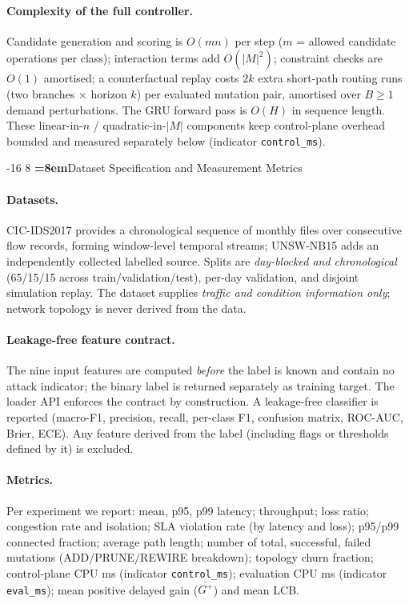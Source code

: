 \documentclass[runningheads]{llncs}
\makeatletter
\renewcommand\section{\@startsection{section}{1}{\z@}%
  {-16\p@ \@plus -4\p@ \@minus -4\p@}%
  {8\p@ \@plus 4\p@ \@minus 4\p@}%
  {\normalfont\large\bfseries\boldmath\color{vitblue}%
   \rightskip=\z@ \@plus 8em\pretolerance=10000}}
\let\plens@section\section
\renewcommand\section{\clearpage\plens@section}
\makeatother
\begin{document}
\paragraph{Complexity of the full controller.}
Candidate generation and scoring is $O(mn)$ per step ($m$ = allowed
candidate operations per class); interaction terms add $O(|M|^2)$;
constraint checks are $O(1)$ amortised; a counterfactual replay costs
$2k$ extra short-path routing runs (two branches $\times$ horizon $k$) per
evaluated mutation pair, amortised over $B \ge 1$ demand perturbations. The
GRU forward pass is $O(H)$ in sequence length. These linear-in-$n$ /
quadratic-in-$|M|$ components keep control-plane overhead bounded and
measured separately below (indicator \texttt{control\_ms}).

\section{Dataset Specification and Measurement Metrics}
\label{sec:data}

\paragraph{Datasets.}
CIC-IDS2017 \cite{sharafaldin2018} provides a chronological sequence of
monthly files over consecutive flow records, forming window-level
temporal streams; UNSW-NB15 \cite{moustafa2015} adds an independently
collected labelled source. Splits are \emph{day-blocked and chronological}
(65/15/15 across train/validation/test), per-day validation, and
disjoint simulation replay. The dataset supplies \emph{traffic and
condition information only}; network topology is never derived from the
data.

\paragraph{Leakage-free feature contract.}
The nine input features are computed \emph{before} the label is known and
contain no attack indicator; the binary label is returned separately as
training target. The loader API enforces the contract by construction.
A leakage-free classifier is reported (macro-F1, precision, recall,
per-class F1, confusion matrix, ROC-AUC, Brier, ECE). Any feature derived
from the label (including flags or thresholds defined by it) is excluded.

\paragraph{Metrics.}
Per experiment we report: mean, p95, p99 latency; throughput; loss
ratio; congestion rate and isolation; SLA violation rate (by latency and
loss); p95/p99 connected fraction; average path length; number of total,
successful, failed mutations (ADD/PRUNE/REWIRE breakdown); topology churn
fraction; control-plane CPU ms (indicator \texttt{control\_ms});
evaluation CPU ms (indicator \texttt{eval\_ms}); mean positive delayed gain
($\overline{G^+}$) and mean LCB.
\end{document}
